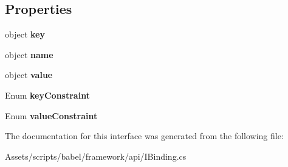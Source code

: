 \subsection*{Properties}
\begin{DoxyCompactItemize}
\item 
\hypertarget{interfacebabel_1_1framework_1_1api_1_1_i_binding_ac57df2a0c37244d530329377358177e8}{object {\bfseries key}}\label{interfacebabel_1_1framework_1_1api_1_1_i_binding_ac57df2a0c37244d530329377358177e8}

\item 
\hypertarget{interfacebabel_1_1framework_1_1api_1_1_i_binding_accc7009d33b5ff0f8f6b39351fb17122}{object {\bfseries name}}\label{interfacebabel_1_1framework_1_1api_1_1_i_binding_accc7009d33b5ff0f8f6b39351fb17122}

\item 
\hypertarget{interfacebabel_1_1framework_1_1api_1_1_i_binding_abe764979414f9f4306a19c77ecabd9e4}{object {\bfseries value}}\label{interfacebabel_1_1framework_1_1api_1_1_i_binding_abe764979414f9f4306a19c77ecabd9e4}

\item 
\hypertarget{interfacebabel_1_1framework_1_1api_1_1_i_binding_aec1aec4fcf07777ce8dae42905901de2}{Enum {\bfseries key\-Constraint}}\label{interfacebabel_1_1framework_1_1api_1_1_i_binding_aec1aec4fcf07777ce8dae42905901de2}

\item 
\hypertarget{interfacebabel_1_1framework_1_1api_1_1_i_binding_a35194e2bb0d23348c88dc0bffe9d178d}{Enum {\bfseries value\-Constraint}}\label{interfacebabel_1_1framework_1_1api_1_1_i_binding_a35194e2bb0d23348c88dc0bffe9d178d}

\end{DoxyCompactItemize}


The documentation for this interface was generated from the following file\-:\begin{DoxyCompactItemize}
\item 
Assets/scripts/babel/framework/api/I\-Binding.\-cs\end{DoxyCompactItemize}
